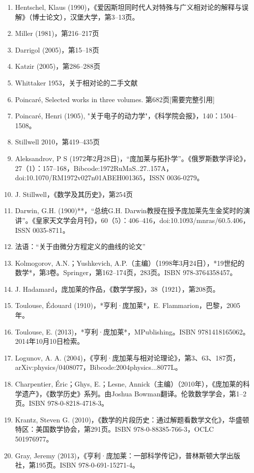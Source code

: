 \begin{enumerate}
\item Hentschel, Klaus (1990)，《爱因斯坦同时代人对特殊与广义相对论的解释与误解》（博士论文），汉堡大学，第3–13页。
\item Miller (1981)，第216–217页
\item Darrigol (2005)，第15–18页
\item Katzir (2005)，第286–288页
\item Whittaker 1953，关于相对论的二手文献
\item Poincaré, Selected works in three volumes. 第682页[需要完整引用]
\item Poincaré, Henri (1905), "关于电子的动力学"，《科学院会报》，140：1504–1508。
\item Stillwell 2010，第419–435页
\item Aleksandrov, P S (1972年2月28日)，“庞加莱与拓扑学”。《俄罗斯数学评论》，27（1）：157–168，Bibcode:1972RuMaS..27..157A，doi:10.1070/RM1972v027n01ABEH001365，ISSN 0036-0279。
\item J. Stillwell，《数学及其历史》，第254页
\item Darwin, G.H. (1900)**，“总统G.H. Darwin教授在授予庞加莱先生金奖时的演讲”。《皇家天文学会月刊》，60（5）：406–416，doi:10.1093/mnras/60.5.406，ISSN 0035-8711。
\item 法语：“关于由微分方程定义的曲线的论文”
\item Kolmogorov, A.N.；Yushkevich, A.P.（主编）（1998年3月24日），*19世纪的数学*，第3卷。Springer，第162–174页，283页。ISBN 978-3764358457。
\item J. Hadamard，庞加莱的作品，《数学学报》，38（1921），第208页。
\item Toulouse, Édouard (1910)，*亨利·庞加莱*，E. Flammarion，巴黎，2005年。
\item Toulouse, E. (2013)，*亨利·庞加莱*，MPublishing。ISBN 9781418165062。2014年10月10日检索。
\item Logunov, A. A. (2004)，《亨利·庞加莱与相对论理论》，第3、63、187页，arXiv:physics/0408077，Bibcode:2004physics...8077L。
\item Charpentier, Éric；Ghys, E.；Lesne, Annick（主编）（2010年），《庞加莱的科学遗产》，《数学历史》系列。由Joshua Bowman翻译。伦敦数学学会，第1–2页。ISBN 978-0-8218-4718-3。
\item Krantz, Steven G. (2010)，《数学的片段历史：通过解题看数学文化》，华盛顿特区：美国数学协会，第291页。ISBN 978-0-88385-766-3，OCLC 501976977。
\item Gray, Jeremy (2013)，《亨利·庞加莱：一部科学传记》，普林斯顿大学出版社，第195页。ISBN 978-0-691-15271-4。

\end{enumerate}
